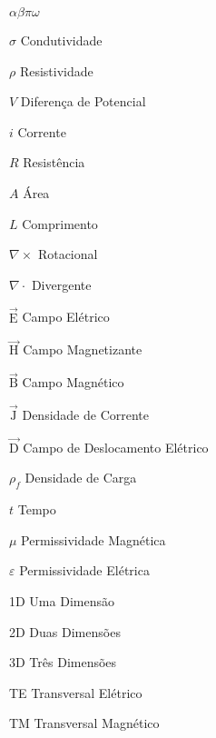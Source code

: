 \documentclass[csgeo,tcc]{unipampa}
\newcommand{\ven}[1]{\vec{\textrm{#1}}}                                         %
\begin{document}

\begin{listofsymbols}{$\alpha\beta\pi\omega$}
       \item[$\sigma$]                  Condutividade
       \item[$\rho$]                    Resistividade
       \item[$V$]                       Diferença de Potencial
       \item[$i$]                       Corrente
       \item[$R$]                       Resistência
       \item[$A$]                       Área
       \item[$L$]                       Comprimento
       \item[$\nabla \times$]           Rotacional
       \item[$\nabla \cdot$]            Divergente
       \item[$\ven{E}$]                 Campo Elétrico
       \item[$\ven{H}$]                 Campo Magnetizante
       \item[$\ven{B}$]                 Campo Magnético
       \item[$\ven{J}$]                 Densidade de Corrente
       \item[$\ven{D}$]                 Campo de Deslocamento Elétrico
       \item[$\rho_f$]                  Densidade de Carga
       \item[$t$]                       Tempo
       \item[$\mu$]                     Permissividade Magnética
       \item[$\varepsilon$]             Permissividade Elétrica
       \item[1D]                        Uma Dimensão
       \item[2D]                        Duas Dimensões
       \item[3D]                        Três Dimensões
       \item[TE]                        Transversal Elétrico
       \item[TM]                        Transversal Magnético
       
\end{listofsymbols}
\end{document}
